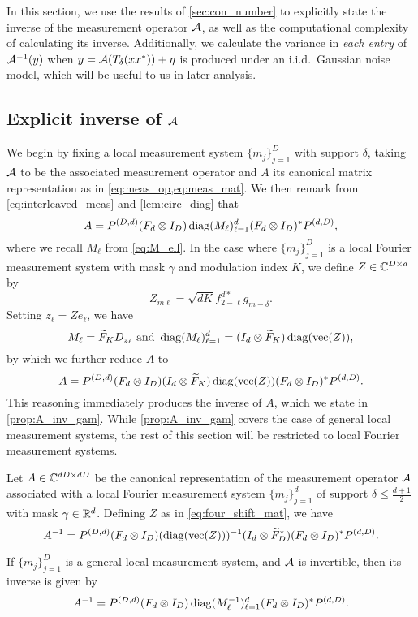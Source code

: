 In this section, we use the results of \cref{sec:con_number} to explicitly state the inverse of the measurement operator $\mathcal{A}$, as well as the computational complexity of calculating its inverse.  Additionally, we calculate the variance in \emph{each entry} of $\mathcal{A}^{-1}(y)$ when $y = \mathcal{A}(T_\delta(x x^*)) + \eta$ is produced under an i.i.d.~Gaussian noise model, which will be useful to us in later analysis.

\subsection{Explicit inverse of $\mathcal{A}$}
\label{sec:inv_runtime}

We begin by fixing a local measurement system $\{m_j\}_{j = 1}^D$ with support $\delta$, taking $\mathcal{A}$ to be the associated measurement operator and $A$ its canonical matrix representation as in \cref{eq:meas_op,eq:meas_mat}.  We then remark from \eqref{eq:interleaved_meas} and \cref{lem:circ_diag} that \[A = P^{(D, d)} (F_d \otimes I_D) \operatorname{diag}(M_\ell)_{\ell = 1}^d (F_d \otimes I_D)^* P^{(d, D)},\]  where we recall $M_\ell$ from \eqref{eq:M_ell}.  In the case where $\{m_j\}_{j = 1}^D$ is a local Fourier measurement system with mask $\gamma$ and modulation index $K$, we define $Z \in \mathbb{C}^{D \times d}$ by \begin{equation} Z_{m \ell} = \sqrt{d K} f_{2 - \ell}^{d*} g_{m - \delta}. \label{eq:four_shift_mat}\end{equation}  Setting $z_\ell = Z e_\ell$, we have \begin{equation} M_\ell = \tF_K D_{z_\ell} \ \text{and} \ \diag(M_\ell)_{\ell = 1}^d = (I_d \otimes \tF_K) \diag(\vec(Z)), \label{eq:M_rearr} \end{equation} by which we further reduce $A$ to \[A = P^{(D, d)} (F_d \otimes I_D) (I_d \otimes \widetilde{F}_K) \operatorname{diag}(\operatorname{vec}(Z)) (F_d \otimes I_D)^* P^{(d, D)}.\]  This reasoning immediately produces the inverse of $A$, which we state in \cref{prop:A_inv_gam}.  While \cref{prop:A_inv_gam} covers the case of general local measurement systems, the rest of this section will be restricted to local Fourier measurement systems.

\begin{proposition}
  Let $A \in \mathbb{C}^{d D \times d D}$ be the canonical representation of the measurement operator $\mathcal{A}$ associated with a local Fourier measurement system $\{m_j\}_{j = 1}^d$ of support $\delta \le \frac{d + 1}{2}$ with mask $\gamma \in \mathbb{R}^d$.  Defining $Z$ as in \eqref{eq:four_shift_mat}, we have
  \begin{equation} A^{-1} = P^{(D, d)} (F_d \otimes I_D) (\operatorname{diag}(\operatorname{vec}(Z)))^{-1} (I_d \otimes \widetilde{F}_D^*) (F_d \otimes I_D)^* P^{(d, D)}. \label{eq:A_inv_gam} \end{equation}

  If $\{m_j\}_{j = 1}^D$ is a general local measurement system, and $\mathcal{A}$ is invertible, then its inverse is given by \[A^{-1} = P^{(D, d)} (F_d \otimes I_D) \operatorname{diag}(M_\ell^{-1})_{\ell = 1}^d (F_d \otimes I_D)^* P^{(d, D)}.\]
  \label{prop:A_inv_gam}
\end{proposition}

